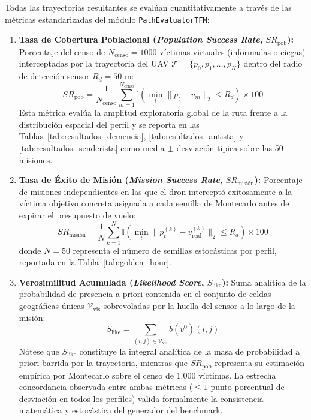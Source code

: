 Todas las trayectorias resultantes se evalúan cuantitativamente a través de las métricas estandarizadas del módulo \texttt{PathEvaluatorTFM}:

\begin{enumerate}
    \item \textbf{Tasa de Cobertura Poblacional (\textit{Population Success Rate}, $SR_{\text{pob}}$):} Porcentaje del censo de $N_{\text{censo}} = 1000$ víctimas virtuales (informadas o ciegas) interceptadas por la trayectoria del UAV $\mathcal{T} = \{p_0, p_1, \dots, p_K\}$ dentro del radio de detección sensor $R_d = 50\text{ m}$:
    \begin{equation}
        SR_{\text{pob}} = \frac{1}{N_{\text{censo}}} \sum_{m=1}^{N_{\text{censo}}} \mathbb{I}\left( \min_{t} \|p_t - v_m\|_2 \le R_d \right) \times 100
    \end{equation}
    Esta métrica evalúa la amplitud exploratoria global de la ruta frente a la distribución espacial del perfil y se reporta en las Tablas~\ref{tab:resultados_demencia}, \ref{tab:resultados_autista} y \ref{tab:resultados_senderista} como media $\pm$ desviación típica sobre las 50 misiones.

    \item \textbf{Tasa de Éxito de Misión (\textit{Mission Success Rate}, $SR_{\text{misión}}$):} Porcentaje de misiones independientes en las que el dron interceptó exitosamente a la víctima objetivo concreta asignada a cada semilla de Montecarlo antes de expirar el presupuesto de vuelo:
    \begin{equation}
        SR_{\text{misión}} = \frac{1}{N} \sum_{k=1}^{N} \mathbb{I}\left( \min_{t} \|p_t^{(k)} - v_{\text{real}}^{(k)}\|_2 \le R_d \right) \times 100
    \end{equation}
    donde $N=50$ representa el número de semillas estocásticas por perfil, reportada en la Tabla~\ref{tab:golden_hour}.

    \item \textbf{Verosimilitud Acumulada (\textit{Likelihood Score}, $S_{\text{like}}$):} Suma analítica de la probabilidad de presencia a priori contenida en el conjunto de celdas geográficas únicas $\mathcal{V}_{\text{vis}}$ sobrevoladas por la huella del sensor a lo largo de la misión:
    \begin{equation}
        S_{\text{like}} = \sum_{(i,j) \in \mathcal{V}_{\text{vis}}} b(v^0)(i, j)
    \end{equation}
    Nótese que $S_{\text{like}}$ constituye la integral analítica de la masa de probabilidad a priori barrida por la trayectoria, mientras que $SR_{\text{pob}}$ representa su estimación empírica por Montecarlo sobre el censo de 1.000 víctimas. La estrecha concordancia observada entre ambas métricas ($\le 1$ punto porcentual de desviación en todos los perfiles) valida formalmente la consistencia matemática y estocástica del generador del benchmark.


\end{enumerate}
